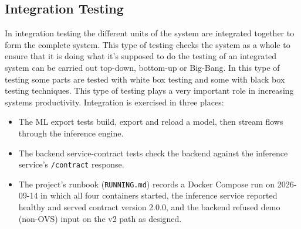 \documentclass[12pt,a4paper]{report}
\begin{document}
\subsection{Integration Testing}

In integration testing the different units of the system are integrated together to form the complete system. This type of testing checks the system as a whole to ensure that it is doing what it's supposed to do the testing of an integrated system can be carried out top-down, bottom-up or Big-Bang. In this type of testing some parts are tested with white box testing and some with black box testing techniques. This type of testing plays a very important role in increasing systems productivity. Integration is exercised in three places:
\begin{itemize}
    \item The ML export tests build, export and reload a model, then stream flows through the inference engine.
    \item The backend service-contract tests check the backend against the inference service's \texttt{/contract} response.
    \item The project's runbook (\texttt{RUNNING.md}) records a Docker Compose run on 2026-09-14 in which all four containers started, the inference service reported healthy and served contract version 2.0.0, and the backend refused demo (non-OVS) input on the v2 path as designed.
\end{itemize}
\end{document}

